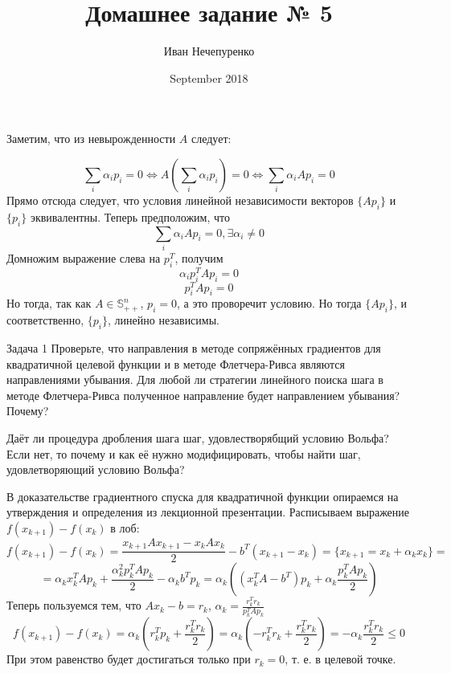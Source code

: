 \documentclass{article}
\title{Домашнее задание № 5}
\author{Иван Нечепуренко }
\date{September 2018}
\begin{document}
Заметим, что из невырожденности $A$ следует:

$$\sum\limits_i \alpha_ip_i = 0 \Leftrightarrow A(\sum\limits_i \alpha_ip_i  ) = 0
\Leftrightarrow 
\sum\limits_i \alpha_iAp_i = 0 $$
Прямо отсюда следует, что условия линейной независимости векторов $\{Ap_i\}$ и $\{p_i\}$ эквивалентны.
Теперь предположим, что 
$$ \sum\limits_i\alpha_iAp_i = 0, \exists \alpha_i \neq 0$$
Домножим выражение слева на $p_i^T$, получим
$$ \alpha_ip_i^TAp_i = 0$$
$$ p_i^TAp_i = 0$$
Но тогда, так как $A \in \mathbb{S}^n_{++}$, $p_i = 0$, а это проворечит условию. Но тогда
$\{Ap_i\}$, и соответственно, $\{p_i\}$, линейно независимы.

Задача 1
Проверьте, что направления в методе сопряжённых градиентов для квадратичной целевой функции и в методе Флетчера-Ривса являются направлениями убывания. Для любой ли стратегии линейного поиска шага в методе Флетчера-Ривса полученное направление будет направлением убывания? Почему?

Даёт ли процедура дробления шага шаг, удовлестворябщий условию Вольфа? Если нет, то почему и как её нужно модифицировать, чтобы найти шаг, удовлетворяющий условию Вольфа?

В доказательстве градиентного спуска для квадратичной функции опираемся на утверждения и определения из лекционной презентации. Расписываем выражение $f(x_{k + 1}) - f(x_k)$ в лоб:
$$f(x_{k + 1}) - f(x_k) = \frac{x_{k + 1}Ax_{k + 1} - x_kAx_k}{2} - b^T(x_{k + 1} - x_k) = 
\{ x_{k + 1} = x_k + \alpha_k x_k \} = $$
$$ = \alpha_k x_k^T A p_k + \frac{\alpha_k^2 p_k^TAp_k}{2} - \alpha_k b^T p_k = 
\alpha_k ((x_k^T A - b^T) p_k + \alpha_k \frac{p_k^TAp_k}{2} )
$$
Теперь пользуемся тем, что $Ax_k - b = r_k$, $ \displaystyle \alpha_k = \frac{r_k^T r_k}{p_k^T A p_k} $
$$f(x_{k + 1}) - f(x_k) = \alpha_k(r_k^Tp_k + \frac{r^T_kr_k}{2} )
= \alpha_k(-r^T_k r_k + \frac{r^T_kr_k}{2} )  =  - \alpha_k \frac{r^T_kr_k}{2}  \leq 0$$
При этом равенство будет достигаться только при $r_k = 0$, т. е. в целевой точке.
\end{document}
